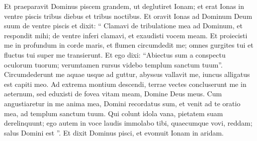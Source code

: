 \begin{biblechapter}
\begin{biblechapter}
\verse Et praeparavit Dominus piscem grandem, ut deglutiret Ionam; et erat Ionas in ventre piscis tribus diebus et tribus noctibus.
 \verse Et oravit Ionas ad Dominum Deum suum de ventre piscis 
\verse et dixit: “ Clamavi de tribulatione mea ad Dominum,
 et respondit mihi;
 de ventre inferi clamavi,
 et exaudisti vocem meam.
 \verse Et proiecisti me in profundum in corde maris,
 et flumen circumdedit me;
 omnes gurgites tui et fluctus tui
 super me transierunt.
 \verse Et ego dixi: “Abiectus sum
 a conspectu oculorum tuorum;
 verumtamen rursus videbo
 templum sanctum tuum”.
 \verse Circumdederunt me aquae usque ad guttur,
 abyssus vallavit me,
 iuncus alligatus est capiti meo.
 \verse Ad extrema montium descendi,
 terrae vectes concluserunt me in aeternum,
 sed eduxisti de fovea vitam meam,
 Domine Deus meus.
 \verse Cum angustiaretur in me anima mea,
 Domini recordatus sum,
 et venit ad te oratio mea,
 ad templum sanctum tuum.
 \verse Qui colunt idola vana,
 pietatem suam derelinquunt;
 \verse ego autem in voce laudis
 immolabo tibi,
 quaecumque vovi, reddam;
 salus Domini est ”.
 \verse Et dixit Dominus pisci, et evomuit Ionam in aridam.
 

\end{biblechapter}
\end{biblechapter}
